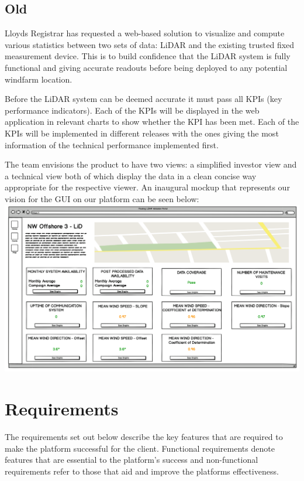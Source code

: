 \documentclass{article}
\begin{document}
\begin{multicols}{2}
    \subsection{Old}
    Lloyds Registrar has requested a web-based solution to visualize and compute various statistics between two sets of data: LiDAR and the existing trusted fixed measurement device. This is to build confidence that the LiDAR system is fully functional and giving accurate readouts before being deployed to any potential windfarm location.
\par Before the LiDAR system can be deemed accurate it must pass all KPIs (key performance indicators). Each of the KPIs will be displayed in the web application in relevant charts to show whether the KPI has been met. Each of the KPIs will be implemented in different releases with the ones giving the most information of the technical performance implemented first.
\par The team envisions the product to have two views: a simplified investor view and a technical view both of which display the data in a clean concise way appropriate for the respective viewer. An inaugural mockup that represents our vision for the GUI on our platform can be seen below:
    \includegraphics[width=\linewidth]{mock1.png}
    
    \section{Requirements}
    The requirements set out below describe the key features that are required to make the platform successful for the client. Functional requirements denote features that are essential to the platform's success and non-functional requirements refer to those that aid and improve the platforms effectiveness.

\end{multicols}
\end{document}
